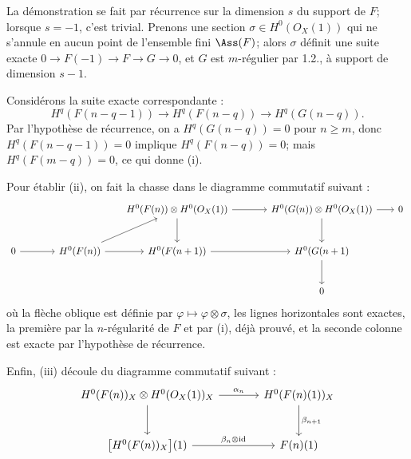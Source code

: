 
La
démonstration se fait par récurrence sur la dimension \(s\) du support de \(F\); lorsque \(s=-1\), c'est trivial. Prenons une section \(\sigma\in H^0({O}_X(1))\) qui ne s'annule en aucun point de l'ensemble fini \(\Ass(F)\); alors \(\sigma\) définit une suite exacte \(0\longrightarrow F(-1)\longrightarrow F\longrightarrow G\longrightarrow 0\), et \(G\) est \(m\)-régulier par 1.2., à support de dimension \(s-1\).

Considérons la suite exacte correspondante :
\[
H^q(F(n-q-1))\longrightarrow H^q(F(n-q))\longrightarrow H^q(G(n-q)).
\]
Par l'hypothèse de récurrence, on a \(H^q(G(n-q))=0\) pour \(n\ge m\), donc \(H^q(F(n-q-1))=0\) implique \(H^q(F(n-q))=0\); mais \(H^q(F(m-q))=0\), ce qui donne (i).

Pour établir (ii), on fait la chasse dans le diagramme commutatif suivant :
\[
\begin{tikzcd}[column sep=1.8em,row sep=2.5em]
 & & & H^0(F(n))\otimes H^0({O}_X(1)) \arrow[rr] \arrow[d]
 & & H^0(G(n))\otimes H^0({O}_X(1)) \arrow[r] \arrow[d]
 & 0 \\
0 \arrow[rr]
& & H^0(F(n)) \arrow[ur] \arrow[r]
& H^0(F(n+1)) \arrow[rr]
& & H^0(G(n+1) \arrow[d] \\
& & & & & 0
\end{tikzcd}
\]
où la flèche oblique est définie par \(\varphi\mapsto\varphi\otimes\sigma\), les lignes horizontales sont exactes, la première par la \(n\)-régularité de \(F\) et par (i), déjà prouvé, et la seconde colonne est exacte par l'hypothèse de récurrence.

Enfin, (iii) découle du diagramme commutatif suivant :
\[
\begin{tikzcd}[column sep=large,row sep=large]
H^0(F(n))_X\otimes H^0({O}_X(1))_X
  \arrow[r,"\alpha_n"]
  \arrow[d]
& H^0(F(n)(1))_X
  \arrow[d,"\beta_{n+1}"] \\
\bigl[H^0(F(n))_X\bigr](1)
  \arrow[r,"\beta_n\otimes\mathrm{id}"]
& F(n)(1)
\end{tikzcd}
\]
